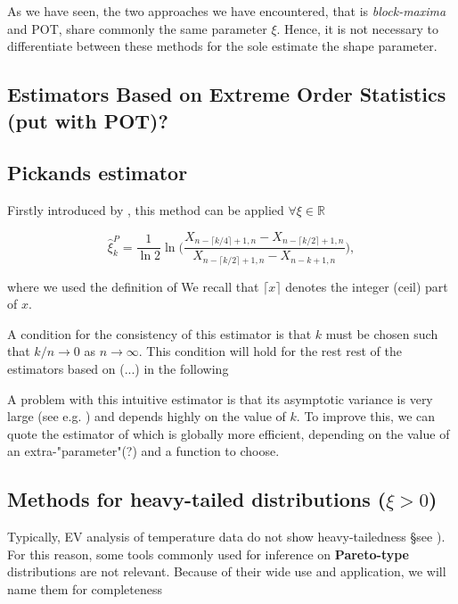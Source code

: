 \documentclass[11pt,a4paper,openany ]{book}
\begin{document}
As we have seen, the two approaches we have encountered, that is \emph{block-maxima} and POT, share commonly the same parameter $\xi$. Hence, it is not necessary to differentiate between these methods for the sole estimate the shape parameter. 

\subsection{Estimators Based on Extreme Order Statistics (put with POT)?}

\subsection*{Pickands estimator}


Firstly introduced by \cite{pickands_statistical_1975}, this method can be applied $\forall\xi\in\mathbb{R}$

\begin{equation}
\hat{\xi}^P_{k}= \frac{1}{\ln 2}\ln \Bigg(\frac{X_{n-\lceil k/4\rceil +1,n}-X_{n-\lceil k/2\rceil+1,n}}{X_{n-\lceil k/2\rceil +1,n}-X_{n-k+1,n}}\Bigg),
\end{equation}

where we used the definition of \citet{beirlant_statistics_2006}
We recall that $\lceil x\rceil$ denotes the integer (ceil) part of $x$.

A condition for the consistency of this estimator is that $k$ must be chosen such that $k/n\rightarrow 0$ as $n\rightarrow \infty$. This condition will hold for the rest rest of the estimators based on (...) in the following 

A problem with this intuitive estimator is that its asymptotic variance is very large (see e.g. \cite{dekkers_estimation_1989}) and depends highly on the value of $k$. To improve this, we can quote the estimator of \cite{segers_generalized_2001} which is globally more efficient, depending on the value of an extra-"parameter"(?) and a function to choose.


\subsection*{Methods for heavy-tailed distributions ($\xi>0$)}

Typically, EV analysis of temperature data do not show heavy-tailedness §see \citet{}). For this reason, some tools commonly used for inference on \textbf{Pareto-type} distributions are not relevant. Because of their wide use and application, we will name them for completeness
\end{document}

